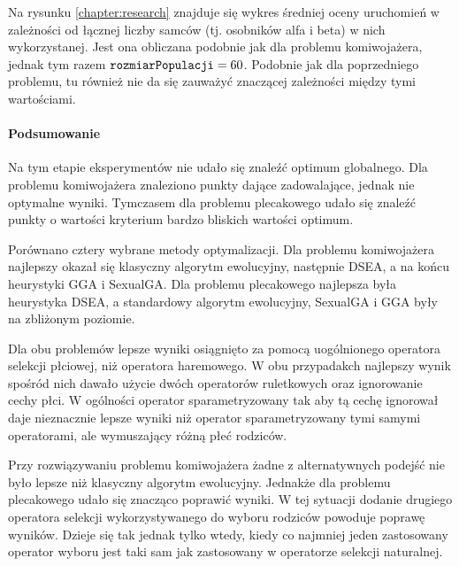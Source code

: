 \documentclass[./FM_mgr.tex]{subfiles}
\begin{document}
Na rysunku \ref{chapter:research} znajduje się wykres średniej oceny uruchomień w zależności od łącznej liczby samców (tj. osobników alfa i beta) w nich wykorzystanej.
Jest ona obliczana podobnie jak dla problemu komiwojażera, jednak tym razem $\mathtt{rozmiarPopulacji}=60$.
Podobnie jak dla poprzedniego problemu, tu również nie da się zauważyć znaczącej zależności między tymi wartościami.

\paragraph{Podsumowanie}

Na tym etapie eksperymentów nie udało się znaleźć optimum globalnego.
Dla problemu komiwojażera znaleziono punkty dające zadowalające, jednak nie optymalne wyniki.
Tymczasem dla problemu plecakowego udało się znaleźć punkty o wartości kryterium bardzo bliskich wartości optimum.

Porównano cztery wybrane metody optymalizacji.
Dla problemu komiwojażera najlepszy okazał się klasyczny algorytm ewolucyjny, następnie DSEA, a na końcu heurystyki GGA i SexualGA.
Dla problemu plecakowego najlepsza była heurystyka DSEA, a standardowy algorytm ewolucyjny, SexualGA i GGA były na zbliżonym poziomie.

Dla obu problemów lepsze wyniki osiągnięto za pomocą uogólnionego operatora selekcji płciowej, niż operatora haremowego.
W obu przypadakch najlepszy wynik spośród nich dawało użycie dwóch operatorów ruletkowych oraz ignorowanie cechy płci.
W ogólności operator sparametryzowany tak aby tą cechę ignorował daje nieznacznie lepsze wyniki niż operator sparametryzowany tymi samymi operatorami, ale wymuszający różną płeć rodziców.

Przy rozwiązywaniu problemu komiwojażera żadne z alternatywnych podejść nie było lepsze niż klasyczny algorytm ewolucyjny.
Jednakże dla problemu plecakowego udało się znacząco poprawić wyniki.
W tej sytuacji dodanie drugiego operatora selekcji wykorzystywanego do wyboru rodziców powoduje poprawę wyników.
Dzieje się tak jednak tylko wtedy, kiedy co najmniej jeden zastosowany operator wyboru jest taki sam jak zastosowany w operatorze selekcji naturalnej.
\end{document}
